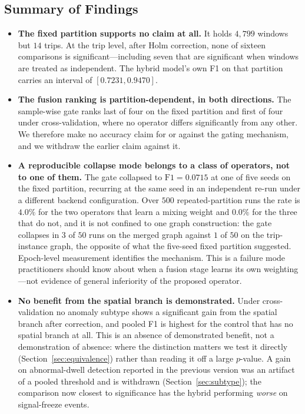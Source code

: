 \documentclass[journal]{IEEEtran}
\begin{document}
\subsection{Summary of Findings}
\begin{itemize}
  \item \textbf{The fixed partition supports no claim at all.} It holds $4{,}799$ windows but $14$ trips. At the trip level, after Holm correction, none of sixteen comparisons is significant---including seven that are significant when windows are treated as independent. The hybrid model's own F1 on that partition carries an interval of $[0.7231, 0.9470]$.
  \item \textbf{The fusion ranking is partition-dependent, in both directions.} The sample-wise gate ranks last of four on the fixed partition and first of four under cross-validation, where no operator differs significantly from any other. We therefore make no accuracy claim for or against the gating mechanism, and we withdraw the earlier claim against it.
  \item \textbf{A reproducible collapse mode belongs to a class of operators, not to one of them.} The gate collapsed to $\mathrm{F1}=0.0715$ at one of five seeds on the fixed partition, recurring at the same seed in an independent re-run under a different backend configuration. Over $500$ repeated-partition runs the rate is $4.0\%$ for the two operators that learn a mixing weight and $0.0\%$ for the three that do not, and it is not confined to one graph construction: the gate collapses in $3$ of $50$ runs on the merged graph against $1$ of $50$ on the trip-instance graph, the opposite of what the five-seed fixed partition suggested. Epoch-level measurement identifies the mechanism. This is a failure mode practitioners should know about when a fusion stage learns its own weighting---not evidence of general inferiority of the proposed operator.
  \item \textbf{No benefit from the spatial branch is demonstrated.} Under cross-validation no anomaly subtype shows a significant gain from the spatial branch after correction, and pooled F1 is highest for the control that has no spatial branch at all. This is an absence of demonstrated benefit, not a demonstration of absence: where the distinction matters we test it directly (Section~\ref{sec:equivalence}) rather than reading it off a large $p$-value. A gain on abnormal-dwell detection reported in the previous version was an artifact of a pooled threshold and is withdrawn (Section~\ref{sec:subtype}); the comparison now closest to significance has the hybrid performing \emph{worse} on signal-freeze events.

\end{itemize}
\end{document}
